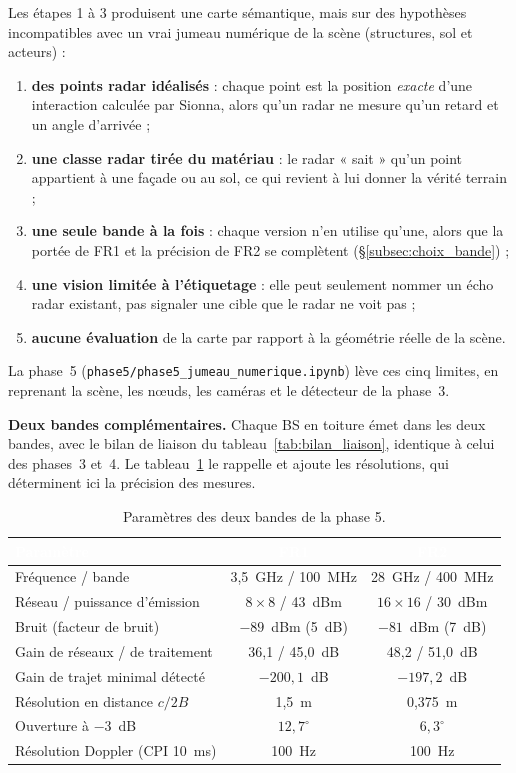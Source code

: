 \documentclass[12pt,a4paper,titlepage]{article}
\newcommand{\hd}[1]{\textcolor{white}{\textbf{#1}}}
\begin{document}
Les étapes 1 à 3 produisent une carte sémantique, mais sur des hypothèses incompatibles avec un vrai jumeau numérique de la scène (structures, sol et acteurs) :
\begin{enumerate}[leftmargin=1.5em]
    \item \textbf{des points radar idéalisés} : chaque point est la position \emph{exacte} d'une interaction calculée par Sionna, alors qu'un radar ne mesure qu'un retard et un angle d'arrivée ;
    \item \textbf{une classe radar tirée du matériau} : le radar « sait » qu'un point appartient à une façade ou au sol, ce qui revient à lui donner la vérité terrain ;
    \item \textbf{une seule bande à la fois} : chaque version n'en utilise qu'une, alors que la portée de FR1 et la précision de FR2 se complètent (\S\ref{subsec:choix_bande}) ;
    \item \textbf{une vision limitée à l'étiquetage} : elle peut seulement nommer un écho radar existant, pas signaler une cible que le radar ne voit pas ;
    \item \textbf{aucune évaluation} de la carte par rapport à la géométrie réelle de la scène.
\end{enumerate}
La phase~5 (\texttt{phase5/phase5\_jumeau\_numerique.ipynb}) lève ces cinq limites, en reprenant la scène, les n\oe uds, les caméras et le détecteur de la phase~3.

\textbf{Deux bandes complémentaires.} Chaque BS en toiture émet dans les deux bandes, avec le bilan de liaison du tableau~\ref{tab:bilan_liaison}, identique à celui des phases~3 et~4. Le tableau~\ref{tab:bandes_phase5} le rappelle et ajoute les résolutions, qui déterminent ici la précision des mesures.

\begin{table}[H]
    \centering
    \caption{Paramètres des deux bandes de la phase 5.}
    \label{tab:bandes_phase5}
    \begin{tabular}{lcc}
        \toprule
        \rowcolor{tabhead}
        \hd{Paramètre} & \hd{FR1} & \hd{FR2} \\
        \midrule
        Fréquence / bande & 3,5~GHz / 100~MHz & 28~GHz / 400~MHz \\
        Réseau / puissance d'émission & $8\times8$ / 43~dBm & $16\times16$ / 30~dBm \\
        Bruit (facteur de bruit) & $-89$~dBm (5~dB) & $-81$~dBm (7~dB) \\
        Gain de réseaux / de traitement & 36,1 / 45,0~dB & 48,2 / 51,0~dB \\
        Gain de trajet minimal détecté & $-200{,}1$~dB & $-197{,}2$~dB \\
        Résolution en distance $c/2B$ & 1,5~m & 0,375~m \\
        Ouverture à $-3$~dB & $12{,}7^\circ$ & $6{,}3^\circ$ \\
        Résolution Doppler (CPI 10~ms) & 100~Hz & 100~Hz \\
        \bottomrule
    \end{tabular}
\end{table}
\end{document}

